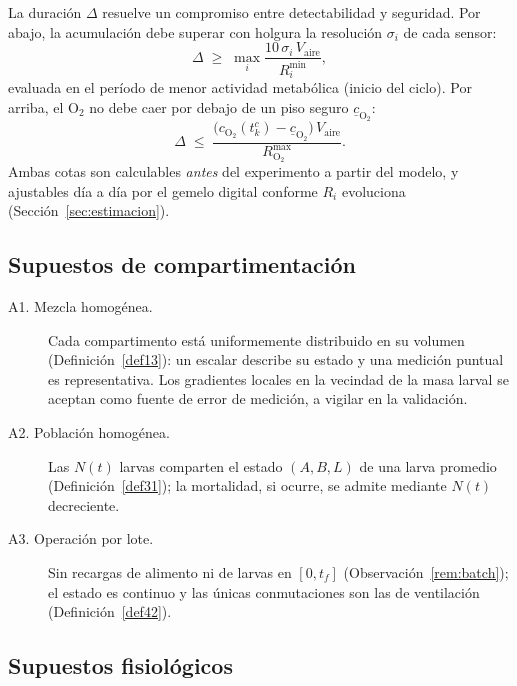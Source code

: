 \begin{remark}\label{rem:delta}
La duración $\Delta$ resuelve un compromiso entre detectabilidad y
seguridad. Por abajo, la acumulación debe superar con holgura la resolución
$\sigma_i$ de cada sensor:
\begin{equation}
\Delta \;\geq\; \max_i \frac{10\,\sigma_i\, V_{\mathrm{aire}}}{R_i^{\min}},
\label{eq:delta-min}
\end{equation}
evaluada en el período de menor actividad metabólica (inicio del ciclo).
Por arriba, el O$_2$ no debe caer por debajo de un piso seguro
$\underline{c}_{\mathrm{O_2}}$:
\begin{equation}
\Delta \;\leq\; \frac{\bigl(c_{\mathrm{O_2}}(t_k^{c})
- \underline{c}_{\mathrm{O_2}}\bigr)\, V_{\mathrm{aire}}}{R_{\mathrm{O_2}}^{\max}}.
\label{eq:delta-max}
\end{equation}
Ambas cotas son calculables \emph{antes} del experimento a partir del
modelo, y ajustables día a día por el gemelo digital conforme $R_i$
evoluciona (Sección~\ref{sec:estimacion}).
\end{remark}

\subsection{Supuestos de compartimentación}

\begin{description}
\item[A1. Mezcla homogénea.] Cada compartimento está uniformemente
distribuido en su volumen (Definición~\ref{def13}): un escalar describe su
estado y una medición puntual es representativa. Los gradientes locales en
la vecindad de la masa larval se aceptan como fuente de error de medición,
a vigilar en la validación.

\item[A2. Población homogénea.] Las $N(t)$ larvas comparten el estado
$(A, B, L)$ de una larva promedio (Definición~\ref{def31}); la mortalidad,
si ocurre, se admite mediante $N(t)$ decreciente.

\item[A3. Operación por lote.] Sin recargas de alimento ni de larvas en
$[0, t_f]$ (Observación~\ref{rem:batch}); el estado es continuo y las
únicas conmutaciones son las de ventilación (Definición~\ref{def42}).
\end{description}

\subsection{Supuestos fisiológicos}

